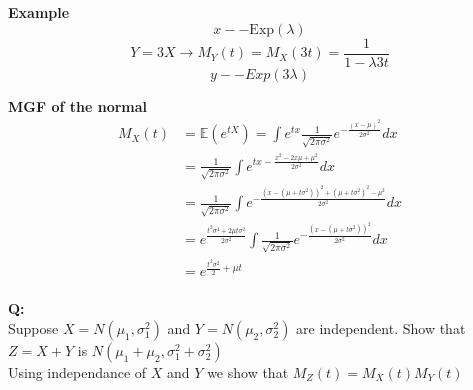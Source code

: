 \documentclass{article}
\newcommand{\expec}[1]{\mathds{E}(#1)}
\begin{document}
\textbf{Example}\\
$$x -- \text{Exp}(\lambda)$$ 
$$Y = 3X \rightarrow M_Y(t) = M_X(3t) = \frac{1}{1-\lambda3t}$$
$$ y -- Exp(3\lambda)$$

\textbf{MGF of the normal}\\
\begin{align*}
M_X(t) &= \expec{e^{tX}} = \int e^{tx} \frac{1}{\sqrt{2\pi \sigma^2}} e^{-\frac{(x - \mu)^2}{2\sigma^2}} dx\\
&= \frac{1}{\sqrt{2\pi \sigma^2}} \int e^{tx-\frac{x^2 - 2x\mu + \mu^2}{2\sigma^2}} dx\\
&= \frac{1}{\sqrt{2\pi \sigma^2}} \int e^{-\frac{(x-(\mu +t \sigma^2))^2 + (\mu + t \sigma^2)^2 - \mu^2}{2 \sigma^2}} dx\\
&= e^{\frac{t^2\sigma^4 + 2 \mu t \sigma^2}{2\sigma^2}} \int \frac{1}{\sqrt{2\pi \sigma^2}} e^{-\frac{(x-(\mu +t \sigma^2))^2}{2\sigma^2}} dx\\
&= e^{\frac{t^2\sigma^2}{2} + \mu t}\\
\end{align*}

\textbf{Q:}\\
Suppose $X = N(\mu_1, \sigma_1^2)$ and $Y = N(\mu_2, \sigma_2^2)$ are independent. Show that $Z = X + Y$ is $N(\mu_1 + \mu_2, \sigma_1^2 + \sigma_2^2)$\\   
Using independance of $X$ and $Y$ we show that $M_Z(t) = M_X(t)M_Y(t)$






\end{document}
